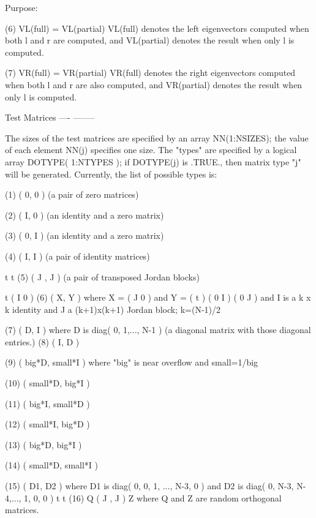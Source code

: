 \begin{DoxyParagraph}{Purpose\+: }
\begin{DoxyVerb}
 (6)  VL(full) = VL(partial)
      VL(full) denotes the left eigenvectors computed when both l
      and r are computed, and VL(partial) denotes the result
      when only l is computed.

 (7)  VR(full) = VR(partial)
      VR(full) denotes the right eigenvectors computed when both l
      and r are also computed, and VR(partial) denotes the result
      when only l is computed.


 Test Matrices
 ---- --------

 The sizes of the test matrices are specified by an array
 NN(1:NSIZES); the value of each element NN(j) specifies one size.
 The "types" are specified by a logical array DOTYPE( 1:NTYPES ); if
 DOTYPE(j) is .TRUE., then matrix type "j" will be generated.
 Currently, the list of possible types is:

 (1)  ( 0, 0 )         (a pair of zero matrices)

 (2)  ( I, 0 )         (an identity and a zero matrix)

 (3)  ( 0, I )         (an identity and a zero matrix)

 (4)  ( I, I )         (a pair of identity matrices)

         t   t
 (5)  ( J , J  )       (a pair of transposed Jordan blocks)

                                     t                ( I   0  )
 (6)  ( X, Y )         where  X = ( J   0  )  and Y = (      t )
                                  ( 0   I  )          ( 0   J  )
                       and I is a k x k identity and J a (k+1)x(k+1)
                       Jordan block; k=(N-1)/2

 (7)  ( D, I )         where D is diag( 0, 1,..., N-1 ) (a diagonal
                       matrix with those diagonal entries.)
 (8)  ( I, D )

 (9)  ( big*D, small*I ) where "big" is near overflow and small=1/big

 (10) ( small*D, big*I )

 (11) ( big*I, small*D )

 (12) ( small*I, big*D )

 (13) ( big*D, big*I )

 (14) ( small*D, small*I )

 (15) ( D1, D2 )        where D1 is diag( 0, 0, 1, ..., N-3, 0 ) and
                        D2 is diag( 0, N-3, N-4,..., 1, 0, 0 )
           t   t
 (16) Q ( J , J ) Z     where Q and Z are random orthogonal matrices.


\end{DoxyVerb}
\end{DoxyParagraph}
